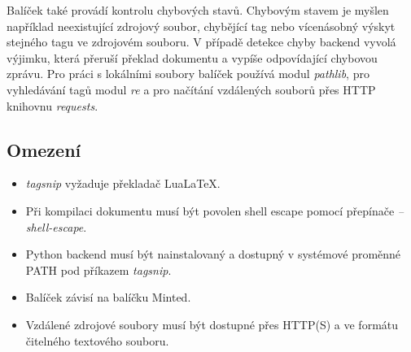 \documentclass{article}
\begin{document}
Balíček také provádí kontrolu chybových stavů. Chybovým stavem je myšlen například
neexistující zdrojový soubor, chybějící tag nebo vícenásobný výskyt stejného tagu ve zdrojovém souboru.
V případě detekce chyby backend vyvolá výjimku, která přeruší překlad dokumentu
a vypíše odpovídající chybovou zprávu.
Pro práci s lokálními soubory balíček používá modul \textit{pathlib},
pro vyhledávání tagů modul \textit{re}
a pro načítání vzdálených souborů přes HTTP knihovnu \textit{requests}.

\subsection*{Omezení}

\begin{itemize}
    \item \textit{tagsnip} vyžaduje překladač LuaLa\TeX{}.
    
    \item Při kompilaci dokumentu musí být povolen shell escape
    pomocí přepínače \textit{--shell-escape}.

    \item Python backend musí být nainstalovaný a dostupný v systémové proměnné PATH
    pod příkazem \textit{tagsnip}.

    \item Balíček závisí na balíčku Minted.

    \item Vzdálené zdrojové soubory musí být dostupné přes HTTP(S)
    a ve formátu čitelného textového souboru.
\end{itemize}



\end{document}
